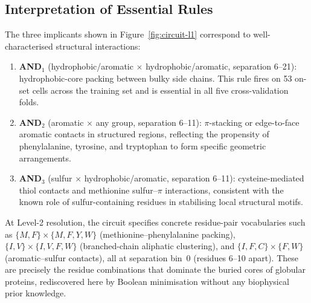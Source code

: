 \subsection{Interpretation of Essential Rules}

The three implicants shown in Figure~\ref{fig:circuit-l1} correspond to
well-characterised structural interactions:
\begin{enumerate}[nosep]
	\item \textbf{AND$_1$} (hydrophobic/aromatic $\times$ hydrophobic/aromatic,
	      separation 6--21): hydrophobic-core packing between bulky side chains.
	      This rule fires on 53 on-set cells across the training set and is
	      essential in all five cross-validation folds.
	\item \textbf{AND$_2$} (aromatic $\times$ any group, separation 6--11):
	      $\pi$-stacking or edge-to-face aromatic contacts in structured regions,
	      reflecting the propensity of phenylalanine, tyrosine, and tryptophan
	      to form specific geometric arrangements.
	\item \textbf{AND$_3$} (sulfur $\times$ hydrophobic/aromatic, separation
	      6--11): cysteine-mediated thiol contacts and methionine sulfur--$\pi$
	      interactions, consistent with the known role of sulfur-containing
	      residues in stabilising local structural motifs.
\end{enumerate}

At Level-2 resolution, the circuit specifies concrete residue-pair vocabularies
such as $\{M,F\} \times \{M,F,Y,W\}$ (methionine--phenylalanine packing),
$\{I,V\} \times \{I,V,F,W\}$ (branched-chain aliphatic clustering), and
$\{I,F,C\} \times \{F,W\}$ (aromatic--sulfur contacts), all at separation
bin~0 (residues 6--10 apart).  These are precisely the residue combinations
that dominate the buried cores of globular proteins, rediscovered here by
Boolean minimisation without any biophysical prior knowledge.

